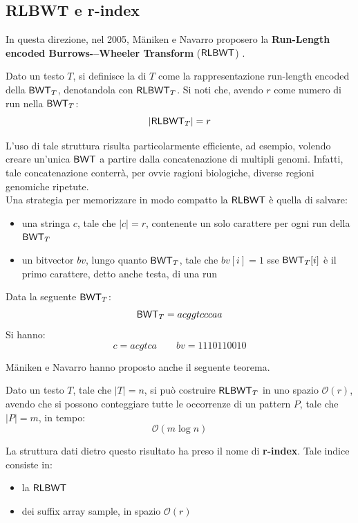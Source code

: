 \subsection{RLBWT e r-index}
In questa direzione, nel 2005, M\"{a}niken e Navarro proposero la
\textbf{Run-Length encoded Burrows-–Wheeler Transform} ($\mbox{\rm {\sf RLBWT}}$)
\cite{rlbwt}.
\begin{definizione}
  Dato un testo $T$, si definisce la \RLBWT di $T$
  come la rappresentazione run-length encoded della $\mbox{\rm {\sf BWT}}_T$,
  denotandola con $\mbox{\rm {\sf RLBWT}}_T$. Si noti che, avendo $r$ come numero di run nella
  $\mbox{\rm {\sf BWT}}_T$: 
  \begin{equation}
    \label{eq:rlbwt1}
    |\mbox{\rm {\sf RLBWT}}_T|=r
  \end{equation}
\end{definizione}
L'uso di tale
struttura risulta particolarmente efficiente, ad esempio, volendo creare
un'unica $\mbox{\rm {\sf BWT}}$ a partire dalla concatenazione di multipli
genomi. Infatti, tale
concatenazione conterrà, per ovvie ragioni biologiche, diverse regioni genomiche
ripetute. \\
Una strategia per memorizzare in modo compatto la $\mbox{\rm {\sf RLBWT}}$ è quella
di salvare: 
\begin{itemize}
  \item una stringa $c$, tale che $|c|=r$, contenente un solo carattere per ogni
  run della $\mbox{\rm {\sf BWT}}_T$
  \item un bitvector $bv$, lungo quanto $\mbox{\rm {\sf BWT}}_T$, tale che $bv[i]=1$ sse
  $\mbox{\rm {\sf BWT}}_T[i]$ è il primo carattere, detto anche testa, di una run 
\end{itemize}
\begin{esempio}
  Data la seguente $\mbox{\rm {\sf BWT}}_T$:
  \[\mbox{\rm {\sf BWT}}_T=acggtcccaa\]
  Si hanno:
  \[c=acgtca\quad \quad bv=1110110010\]
\end{esempio}
M\"{a}niken e Navarro hanno proposto anche il seguente teorema.
\begin{teorema}
  Dato un testo $T$, tale che $|T|=n$, si può costruire $\mbox{\rm {\sf RLBWT}}_T$ in
  uno spazio $\mathcal{O}(r)$, avendo che si possono conteggiare tutte le
  occorrenze di un pattern $P$, tale che $|P|=m$, in tempo:
  \begin{equation}
    \label{eq:rlbwt2}
    \mathcal{O}(m\log n)
  \end{equation}
\end{teorema}
\noindent
La struttura dati dietro questo risultato ha preso il nome di \textbf{r-index}.
Tale indice consiste in: 
\begin{itemize}
  \item la $\mbox{\rm {\sf RLBWT}}$
  \item dei suffix array sample, in spazio $\mathcal{O}(r)$
\end{itemize}
